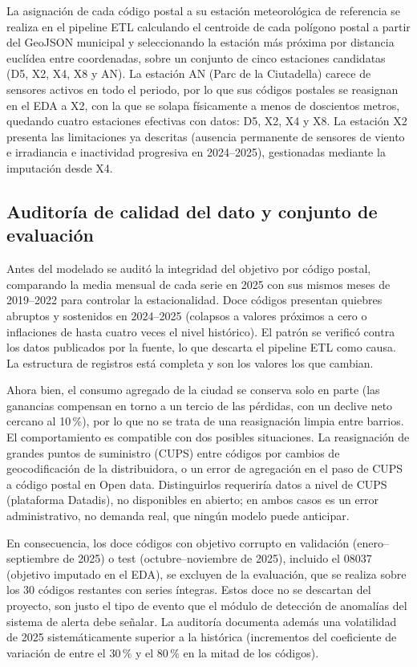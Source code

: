 \documentclass[12pt, a4paper]{article}
\begin{document}
La asignación de cada código postal a su estación meteorológica de referencia se realiza en el pipeline ETL calculando el centroide de cada polígono postal a partir del GeoJSON municipal y seleccionando la estación más próxima por distancia euclídea entre coordenadas, sobre un conjunto de cinco estaciones candidatas (D5, X2, X4, X8 y AN). La estación AN (Parc de la Ciutadella) carece de sensores activos en todo el periodo, por lo que sus códigos postales se reasignan en el EDA a X2, con la que se solapa físicamente a menos de doscientos metros, quedando cuatro estaciones efectivas con datos: D5, X2, X4 y X8. La estación X2 presenta las limitaciones ya descritas (ausencia permanente de sensores de viento e irradiancia e inactividad progresiva en 2024--2025), gestionadas mediante la imputación desde X4.

\subsection{Auditoría de calidad del dato y conjunto de evaluación}

Antes del modelado se auditó la integridad del objetivo por código postal, comparando la media mensual de cada serie en 2025 con sus mismos meses de 2019--2022 para controlar la estacionalidad. Doce códigos presentan quiebres abruptos y sostenidos en 2024--2025 (colapsos a valores próximos a cero o inflaciones de hasta cuatro veces el nivel histórico). El patrón se verificó contra los datos publicados por la fuente, lo que descarta el pipeline ETL como causa. La estructura de registros está completa y son los valores los que cambian. 

Ahora bien, el consumo agregado de la ciudad se conserva solo en parte (las ganancias compensan en torno a un tercio de las pérdidas, con un declive neto cercano al 10\,\%), por lo que no se trata de una reasignación limpia entre barrios. El comportamiento es compatible con dos posibles situaciones. La reasignación de grandes puntos de suministro (CUPS) entre códigos por cambios de geocodificación de la distribuidora, o un error de agregación en el paso de CUPS a código postal en Open data. Distinguirlos requeriría datos a nivel de CUPS (plataforma Datadis), no disponibles en abierto; en ambos casos es un error administrativo, no demanda real, que ningún modelo puede anticipar.

En consecuencia, los doce códigos con objetivo corrupto en validación (enero--septiembre de 2025) o test (octubre--noviembre de 2025), incluido el 08037 (objetivo imputado en el EDA), se excluyen de la evaluación, que se realiza sobre los 30 códigos restantes con series íntegras. Estos doce no se descartan del proyecto, son justo el tipo de evento que el módulo de detección de anomalías del sistema de alerta debe señalar. La auditoría documenta además una volatilidad de 2025 sistemáticamente superior a la histórica (incrementos del coeficiente de variación de entre el 30\,\% y el 80\,\% en la mitad de los códigos).
\end{document}
